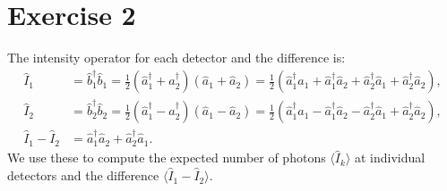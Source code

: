 \documentclass[letterpaper,11pt,twoside]{article}
\newcommand{\ha}{\hat{a}}
\newcommand{\hb}{\hat{b}}
\newcommand{\hI}{\hat{I}}
\newcommand{\braket}[1]{\langle#1\rangle}
\begin{document}
\section*{Exercise 2}
The intensity operator for each detector and the difference is:
\begin{align*}
  \hI_1&=\hb_1^\dagger\hb_1=\frac{1}{2}(\ha_1^\dagger+\ha^\dagger_2)(\ha_1+\ha_2)=\frac{1}{2}(\ha_1^\dagger\ha_1+\ha_1^\dagger\ha_2+\ha_2^\dagger\ha_1+\ha_2^\dagger\ha_2),\\
  \hI_2&=\hb_2^\dagger\hb_2=\frac{1}{2}(\ha_1^\dagger-\ha^\dagger_2)(\ha_1-\ha_2)=\frac{1}{2}(\ha_1^\dagger\ha_1-\ha_1^\dagger\ha_2-\ha_2^\dagger\ha_1+\ha_2^\dagger\ha_2),\\
  \hI_1-\hI_2&=\ha_1^\dagger\ha_2+\ha_2^\dagger\ha_1.
\end{align*}
We use these to compute the expected number of photons $\braket{\hI_k}$ at individual detectors and the difference $\braket{\hI_1-\hI_2}$.
\end{document}
